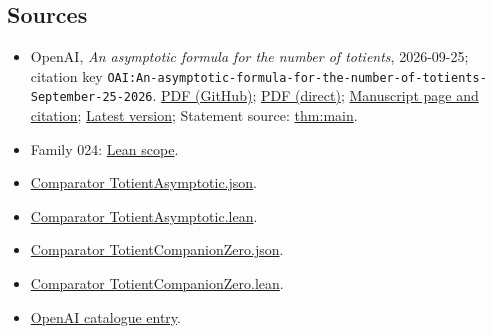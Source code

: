 \documentclass[11pt]{article}
\begin{document}
\subsection{Sources}
\begin{itemize}
\item OpenAI, \emph{An asymptotic formula for the number of totients}, 2026-09-25; citation key \texttt{OAI:An-asymptotic-formula-for-the-number-of-totients-September-25-2026}. \href{https://github.com/openai/math/blob/adc7f1241b42e322a6451854ab7e4b4c146bf78a/preprints/An-asymptotic-formula-for-the-number-of-totients-September-25-2026/An-asymptotic-formula-for-the-number-of-totients-September-25-2026.pdf}{PDF (GitHub)}; \href{https://github.com/openai/math/raw/adc7f1241b42e322a6451854ab7e4b4c146bf78a/preprints/An-asymptotic-formula-for-the-number-of-totients-September-25-2026/An-asymptotic-formula-for-the-number-of-totients-September-25-2026.pdf}{PDF (direct)}; \href{https://github.com/openai/math/blob/adc7f1241b42e322a6451854ab7e4b4c146bf78a/preprints/An-asymptotic-formula-for-the-number-of-totients-September-25-2026/README.md}{Manuscript page and citation}; \href{https://github.com/openai/math/blob/main/preprints/An-asymptotic-formula-for-the-number-of-totients-September-25-2026/An-asymptotic-formula-for-the-number-of-totients-September-25-2026.pdf}{Latest version}; Statement source: \href{https://github.com/openai/math/blob/adc7f1241b42e322a6451854ab7e4b4c146bf78a/preprints/An-asymptotic-formula-for-the-number-of-totients-September-25-2026/build/source/statements.tex\#L45}{thm:main}.
\item Family 024: \href{https://github.com/openai/math/blob/adc7f1241b42e322a6451854ab7e4b4c146bf78a/lean/docs/024.md}{Lean scope}.
\item \href{https://github.com/openai/math/blob/adc7f1241b42e322a6451854ab7e4b4c146bf78a/lean/ComparatorChallenges/TotientAsymptotic.json}{Comparator TotientAsymptotic.json}.
\item \href{https://github.com/openai/math/blob/adc7f1241b42e322a6451854ab7e4b4c146bf78a/lean/ComparatorChallenges/TotientAsymptotic.lean}{Comparator TotientAsymptotic.lean}.
\item \href{https://github.com/openai/math/blob/adc7f1241b42e322a6451854ab7e4b4c146bf78a/lean/ComparatorChallenges/TotientCompanionZero.json}{Comparator TotientCompanionZero.json}.
\item \href{https://github.com/openai/math/blob/adc7f1241b42e322a6451854ab7e4b4c146bf78a/lean/ComparatorChallenges/TotientCompanionZero.lean}{Comparator TotientCompanionZero.lean}.
\item \href{https://github.com/openai/math/blob/adc7f1241b42e322a6451854ab7e4b4c146bf78a/CONTENTS.md}{OpenAI catalogue entry}.
\end{itemize}
\end{document}
